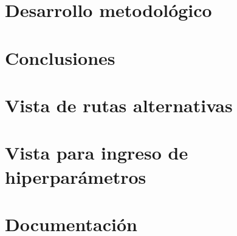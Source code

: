 \documentclass[stu, 12pt, noextraspace, floatsintext]{apa7}
\begin{document}
\clearpage
\section{Desarrollo metodológico}


\clearpage
\section{Conclusiones}


\clearpage
\printbibliography[{heading=bibintoc}]
\thispagestyle{otherplain}

\appendix

\section{Vista de rutas alternativas}


\section{Vista para ingreso de hiperparámetros}


\section{Documentación}



\end{document}
